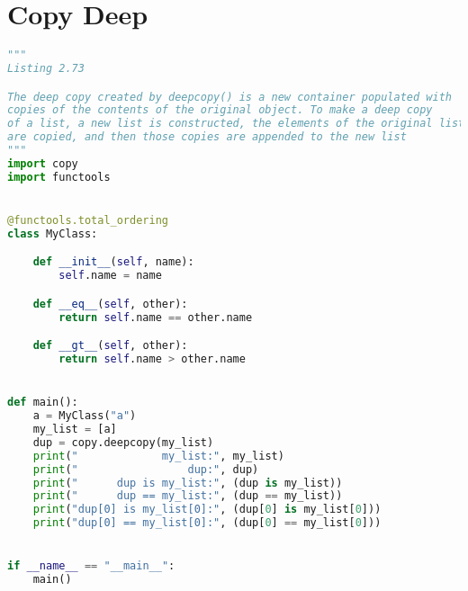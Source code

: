 \documentclass[a4paper,landscape]{report}
\begin{document}
\section{Copy Deep}
\begin{lstlisting}[language=Python]
"""
Listing 2.73

The deep copy created by deepcopy() is a new container populated with
copies of the contents of the original object. To make a deep copy
of a list, a new list is constructed, the elements of the original list
are copied, and then those copies are appended to the new list
"""
import copy
import functools


@functools.total_ordering
class MyClass:

    def __init__(self, name):
        self.name = name

    def __eq__(self, other):
        return self.name == other.name

    def __gt__(self, other):
        return self.name > other.name


def main():
    a = MyClass("a")
    my_list = [a]
    dup = copy.deepcopy(my_list)
    print("             my_list:", my_list)
    print("                 dup:", dup)
    print("      dup is my_list:", (dup is my_list))
    print("      dup == my_list:", (dup == my_list))
    print("dup[0] is my_list[0]:", (dup[0] is my_list[0]))
    print("dup[0] == my_list[0]:", (dup[0] == my_list[0]))


if __name__ == "__main__":
    main()

\end{lstlisting}
\end{document}
